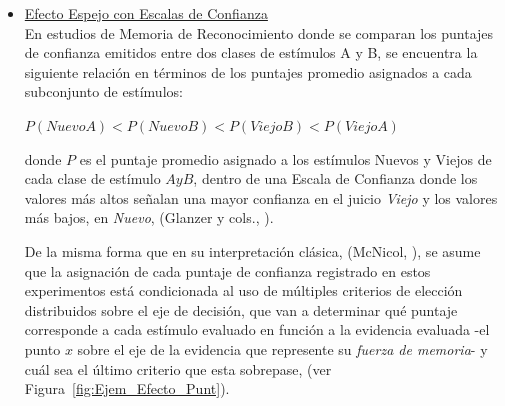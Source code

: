 \begin{itemize}
\item \underline{Efecto Espejo con Escalas de Confianza}\\

En estudios de Memoria de Reconocimiento donde se comparan los puntajes de confianza emitidos entre dos clases de estímulos A y B, se encuentra la siguiente relación en términos de los puntajes promedio asignados a cada  subconjunto de estímulos:\\

\begin{center}
$P(NuevoA) < P(NuevoB) < P(ViejoB) < P(ViejoA)$\\
\end{center}
\begin{center}
donde $P$ es el puntaje promedio asignado a los estímulos Nuevos y Viejos de cada clase de estímulo $A y B$, dentro de una Escala de Confianza donde los valores más altos señalan una mayor confianza en el juicio \textit{Viejo} y los valores más bajos, en \textit{Nuevo}, (Glanzer y cols., \citeyear{Glanzer1993}).\\
\end{center}

De la misma forma que en su interpretación clásica, (McNicol, \citeyear{McNicol2, McNicol5}), se asume que la asignación de cada puntaje de confianza registrado en estos experimentos está condicionada al uso de múltiples criterios de elección distribuidos sobre el eje de decisión, que van a determinar qué puntaje corresponde a cada estímulo evaluado en función a la evidencia evaluada -el punto $x$ sobre el eje de la evidencia que represente su \textit{fuerza de memoria}- y cuál sea el último criterio que esta sobrepase, (ver Figura~\ref{fig:Ejem_Efecto_Punt}).\\


\end{itemize}
